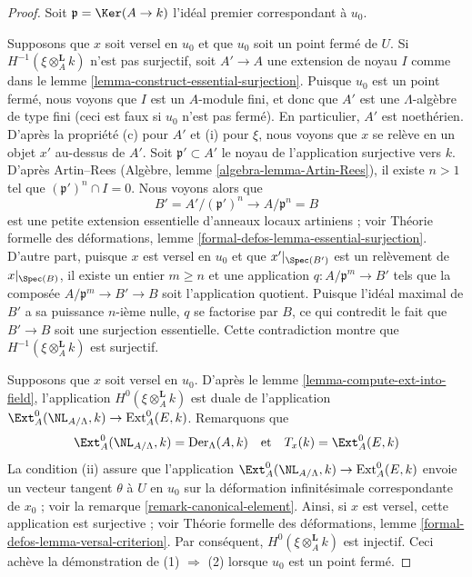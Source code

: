 \begin{proof}
Soit $\mathfrak p = \Ker(A \to k)$ l'idéal premier correspondant à $u_0$.

\medskip\noindent
Supposons que $x$ soit versel en $u_0$ et que $u_0$ soit un point fermé de
$U$. Si $H^{-1}(\xi \otimes_A^{\mathbf{L}} k)$ n'est pas surjectif, soit
$A' \to A$ une extension de noyau $I$ comme dans le lemme
\ref{lemma-construct-essential-surjection}. Puisque $u_0$ est un point fermé,
nous voyons que $I$ est un $A$-module fini, et donc que $A'$ est une
$\Lambda$-algèbre de type fini (ceci est faux si $u_0$ n'est pas fermé). En
particulier, $A'$ est noethérien. D'après la propriété (c) pour $A'$ et (i)
pour $\xi$, nous voyons que $x$ se relève en un objet $x'$ au-dessus de $A'$.
Soit $\mathfrak p' \subset A'$ le noyau de l'application surjective vers $k$.
D'après Artin--Rees (Algèbre, lemme \ref{algebra-lemma-Artin-Rees}), il existe
$n > 1$ tel que $(\mathfrak p')^n \cap I = 0$. Nous voyons alors que
$$
B' = A'/(\mathfrak p')^n \longrightarrow A/\mathfrak p^n = B
$$
est une petite extension essentielle d'anneaux locaux artiniens ; voir Théorie
formelle des déformations, lemme
\ref{formal-defos-lemma-essential-surjection}. D'autre part, puisque $x$ est
versel en $u_0$ et que $x'|_{\Spec(B')}$ est un relèvement de
$x|_{\Spec(B)}$, il existe un entier $m \geq n$ et une application
$q : A/\mathfrak p^m \to B'$ tels que la composée
$A/\mathfrak p^m \to B' \to B$ soit l'application quotient. Puisque
l'idéal maximal de $B'$ a sa puissance $n$-ième nulle, $q$ se factorise par
$B$, ce qui contredit le fait que $B' \to B$ soit une surjection essentielle.
Cette contradiction montre que $H^{-1}(\xi \otimes_A^{\mathbf{L}} k)$ est
surjectif.

\medskip\noindent
Supposons que $x$ soit versel en $u_0$. D'après le lemme
\ref{lemma-compute-ext-into-field}, l'application
$H^0(\xi \otimes_A^{\mathbf{L}} k)$ est duale de l'application
$\Ext^0_A(\NL_{A/\Lambda}, k) \to \text{Ext}^0_A(E, k)$. Remarquons que
$$
\Ext^0_A(\NL_{A/\Lambda}, k) = \text{Der}_\Lambda(A, k)
\quad\text{et}\quad
T_x(k) = \Ext^0_A(E, k)
$$
La condition (ii) assure que l'application
$\Ext^0_A(\NL_{A/\Lambda}, k) \to \text{Ext}^0_A(E, k)$ envoie un vecteur
tangent $\theta$ à $U$ en $u_0$ sur la déformation infinitésimale
correspondante de $x_0$ ; voir la remarque \ref{remark-canonical-element}.
Ainsi, si $x$ est versel, cette application est surjective ; voir Théorie
formelle des déformations, lemme \ref{formal-defos-lemma-versal-criterion}.
Par conséquent, $H^0(\xi \otimes_A^{\mathbf{L}} k)$ est injectif. Ceci achève
la démonstration de (1) $\Rightarrow$ (2) lorsque $u_0$ est un point fermé.


\end{proof}
